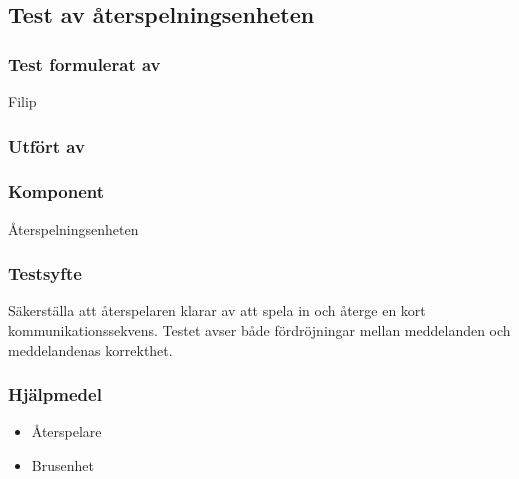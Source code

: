 \clearpage
\subsection{Test av återspelningsenheten}
\label{test:replayer}

\setlength{\columnsep}{1cm}




\begin{multicols}{2}
\subsubsection*{Test formulerat av}
Filip

\subsubsection*{Utfört av}



\end{multicols}
\subsubsection*{Komponent}
Återspelningsenheten


\subsubsection*{Testsyfte}
Säkerställa att återspelaren klarar av att spela in och återge en kort kommunikationssekvens.
Testet avser både fördröjningar mellan meddelanden och meddelandenas korrekthet.


\subsubsection*{Hjälpmedel}
\begin{itemize}
	\item Återspelare
	\item Brusenhet
\end{itemize}



